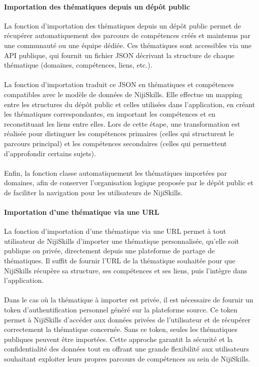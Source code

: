 \documentclass[12pt]{article}
\begin{document}
\paragraph{Importation des thématiques depuis un dépôt public\\}
La fonction d'importation des thématiques depuis un dépôt public permet de récupérer automatiquement des parcours de compétences créés et maintenus par une communauté ou une équipe dédiée. Ces thématiques sont accessibles via une API publique, qui fournit un fichier JSON décrivant la structure de chaque thématique (domaines, compétences, liens, etc.).
\\\\
La fonction d'importation traduit ce JSON en thématiques et compétences compatibles avec le modèle de données de NijiSkills. Elle effectue un mapping entre les structures du dépôt public et celles utilisées dans l'application, en créant les thématiques correspondantes, en important les compétences et en reconstituant les liens entre elles. Lors de cette étape, une transformation est réalisée pour distinguer les compétences primaires (celles qui structurent le parcours principal) et les compétences secondaires (celles qui permettent d'approfondir certains sujets).
\\\\
Enfin, la fonction classe automatiquement les thématiques importées par domaines, afin de conserver l'organisation logique proposée par le dépôt public et de faciliter la navigation pour les utilisateurs de NijiSkills.
\paragraph{Importation d'une thématique via une URL\\}
La fonction d'importation d'une thématique via une URL permet à tout utilisateur de NijiSkills d'importer une thématique personnalisée, qu'elle soit publique ou privée, directement depuis une plateforme de partage de thématiques. Il suffit de fournir l'URL de la thématique souhaitée pour que NijiSkills récupère sa structure, ses compétences et ses liens, puis l'intègre dans l'application.
\\\\
Dans le cas où la thématique à importer est privée, il est nécessaire de fournir un token d'authentification personnel généré sur la plateforme source. Ce token permet à NijiSkills d'accéder aux données privées de l'utilisateur et de récupérer correctement la thématique concernée. Sans ce token, seules les thématiques publiques peuvent être importées. Cette approche garantit la sécurité et la confidentialité des données tout en offrant une grande flexibilité aux utilisateurs souhaitant exploiter leurs propres parcours de compétences au sein de NijiSkills.
\end{document}
